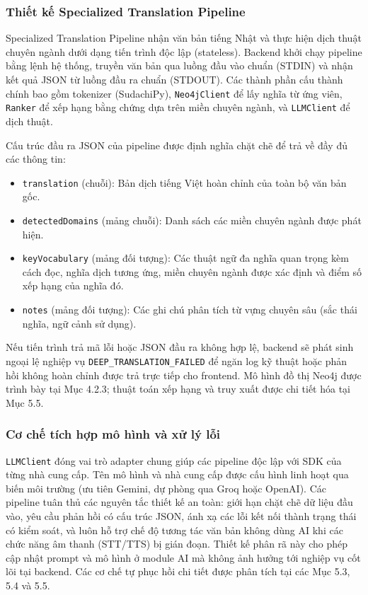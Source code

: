 \documentclass[../DoAn.tex]{subfiles}
\begin{document}
\subsubsection{Thiết kế Specialized Translation Pipeline}

Specialized Translation Pipeline nhận văn bản tiếng Nhật và thực hiện dịch thuật chuyên ngành dưới dạng tiến trình độc lập (stateless). Backend khởi chạy pipeline bằng lệnh hệ thống, truyền văn bản qua luồng đầu vào chuẩn (STDIN) và nhận kết quả JSON từ luồng đầu ra chuẩn (STDOUT). Các thành phần cấu thành chính bao gồm tokenizer (SudachiPy), \texttt{Neo4jClient} để lấy nghĩa từ ứng viên, \texttt{Ranker} để xếp hạng bằng chứng dựa trên miền chuyên ngành, và \texttt{LLMClient} để dịch thuật.

Cấu trúc đầu ra JSON của pipeline được định nghĩa chặt chẽ để trả về đầy đủ các thông tin:
\begin{itemize}
    \item \texttt{translation} (chuỗi): Bản dịch tiếng Việt hoàn chỉnh của toàn bộ văn bản gốc.
    \item \texttt{detectedDomains} (mảng chuỗi): Danh sách các miền chuyên ngành được phát hiện.
    \item \texttt{keyVocabulary} (mảng đối tượng): Các thuật ngữ đa nghĩa quan trọng kèm cách đọc, nghĩa dịch tương ứng, miền chuyên ngành được xác định và điểm số xếp hạng của nghĩa đó.
    \item \texttt{notes} (mảng đối tượng): Các ghi chú phân tích từ vựng chuyên sâu (sắc thái nghĩa, ngữ cảnh sử dụng).
\end{itemize}

Nếu tiến trình trả mã lỗi hoặc JSON đầu ra không hợp lệ, backend sẽ phát sinh ngoại lệ nghiệp vụ \texttt{DEEP\_TRANSLATION\_FAILED} để ngăn log kỹ thuật hoặc phản hồi không hoàn chỉnh được trả trực tiếp cho frontend. Mô hình đồ thị Neo4j được trình bày tại Mục 4.2.3; thuật toán xếp hạng và truy xuất được chi tiết hóa tại Mục 5.5.

\subsubsection{Cơ chế tích hợp mô hình và xử lý lỗi}

\texttt{LLMClient} đóng vai trò adapter chung giúp các pipeline độc lập với SDK của từng nhà cung cấp. Tên mô hình và nhà cung cấp được cấu hình linh hoạt qua biến môi trường (ưu tiên Gemini, dự phòng qua Groq hoặc OpenAI). Các pipeline tuân thủ các nguyên tắc thiết kế an toàn: giới hạn chặt chẽ dữ liệu đầu vào, yêu cầu phản hồi có cấu trúc JSON, ánh xạ các lỗi kết nối thành trạng thái có kiểm soát, và luôn hỗ trợ chế độ tương tác văn bản không dùng AI khi các chức năng âm thanh (STT/TTS) bị gián đoạn. Thiết kế phân rã này cho phép cập nhật prompt và mô hình ở module AI mà không ảnh hưởng tới nghiệp vụ cốt lõi tại backend. Các cơ chế tự phục hồi chi tiết được phân tích tại các Mục 5.3, 5.4 và 5.5.
\end{document}
